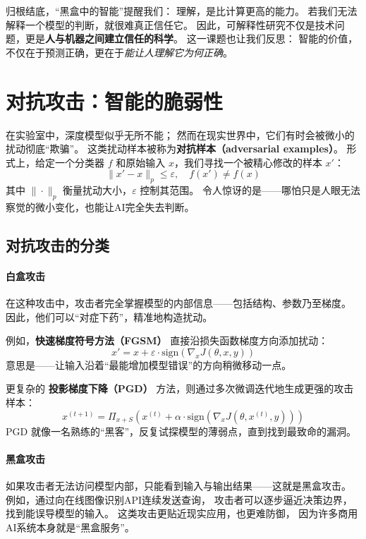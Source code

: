 归根结底，“黑盒中的智能”提醒我们：  
理解，是比计算更高的能力。  
若我们无法解释一个模型的判断，就很难真正信任它。  
因此，可解释性研究不仅是技术问题，更是\textbf{人与机器之间建立信任的科学}。  
这一课题也让我们反思：  
智能的价值，不仅在于预测正确，更在于\textit{能让人理解它为何正确}。

\section{对抗攻击：智能的脆弱性}

在实验室中，深度模型似乎无所不能；  
然而在现实世界中，它们有时会被微小的扰动彻底“欺骗”。  
这类扰动样本被称为\textbf{对抗样本（adversarial examples）}。  
形式上，给定一个分类器 $f$ 和原始输入 $x$，我们寻找一个被精心修改的样本 $x'$：  
$$\|x' - x\|_p \leq \varepsilon, \quad f(x') \neq f(x)$$  
其中 $\|\cdot\|_p$ 衡量扰动大小，$\varepsilon$ 控制其范围。  
令人惊讶的是——哪怕只是人眼无法察觉的微小变化，也能让AI完全失去判断。

\subsection{对抗攻击的分类}

\paragraph{白盒攻击}  
在这种攻击中，攻击者完全掌握模型的内部信息——包括结构、参数乃至梯度。  
因此，他们可以“对症下药”，精准地构造扰动。  

例如，\textbf{快速梯度符号方法（FGSM）} 直接沿损失函数梯度方向添加扰动：  
$$x' = x + \varepsilon \cdot \text{sign}(\nabla_x J(\theta, x, y))$$  
意思是——让输入沿着“最能增加模型错误”的方向稍微移动一点。  

更复杂的 \textbf{投影梯度下降（PGD）} 方法，则通过多次微调迭代地生成更强的攻击样本：  
$$x^{(t+1)} = \Pi_{x+S}(x^{(t)} + \alpha \cdot \text{sign}(\nabla_x J(\theta, x^{(t)}, y)))$$  
PGD 就像一名熟练的“黑客”，反复试探模型的薄弱点，直到找到最致命的漏洞。

\paragraph{黑盒攻击}  
如果攻击者无法访问模型内部，只能看到输入与输出结果——这就是黑盒攻击。  
例如，通过向在线图像识别API连续发送查询，  
攻击者可以逐步逼近决策边界，找到能误导模型的输入。  
这类攻击更贴近现实应用，也更难防御，  
因为许多商用AI系统本身就是“黑盒服务”。

